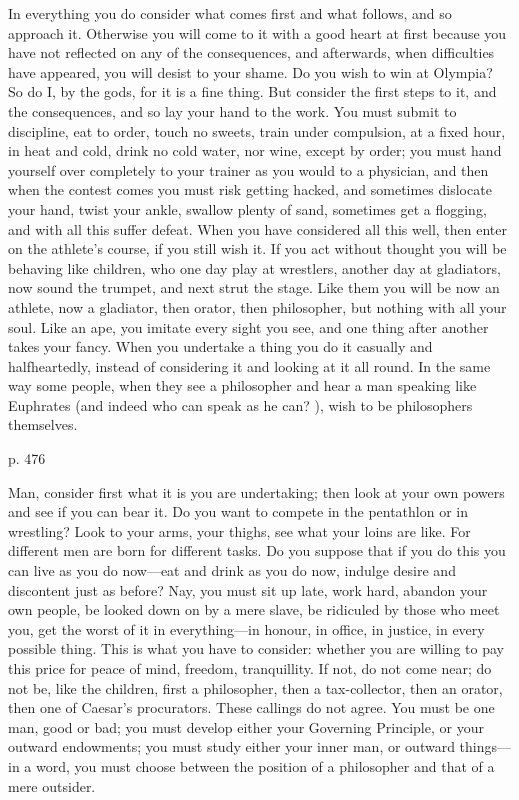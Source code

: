 In  everything you  do  consider what  comes  first and  what  follows, and  so
approach it. Otherwise you  will come to it with a good  heart at first because
you  have not  reflected  on  any of  the  consequences,  and afterwards,  when
difficulties have appeared, you  will desist to your shame. Do  you wish to win
at Olympia?  So do I,  by the gods,  for it is a  fine thing. But  consider the
first steps to it, and the consequences, and  so lay your hand to the work. You
must  submit  to  discipline,  eat  to order,  touch  no  sweets,  train  under
compulsion, at a fixed  hour, in heat and cold, drink no  cold water, nor wine,
except by order; you must hand yourself  over completely to your trainer as you
would to  a physician, and  then when the contest  comes you must  risk getting
hacked, and sometimes dislocate your hand,  twist your ankle, swallow plenty of
sand, sometimes get a flogging, and with  all this suffer defeat. When you have
considered all this well, then enter on the athlete's course, if you still wish
it. If you act without thought you  will be behaving like children, who one day
play at wrestlers,  another day at gladiators, now sound  the trumpet, and next
strut the stage.  Like them you will  be now an athlete, now  a gladiator, then
orator, then  philosopher, but  nothing with  all your soul.  Like an  ape, you
imitate every sight you see, and one thing after another takes your fancy. When
you  undertake  a thing  you  do  it  casually  and halfheartedly,  instead  of
considering it and looking  at it all round. In the same  way some people, when
they see a philosopher  and hear a man speaking like  Euphrates (and indeed who
can speak as he can? ), wish to be philosophers themselves.

p. 476

Man, consider  first what  it is  you are  undertaking; then  look at  your own
powers and see if you can bear it.  Do you want to compete in the pentathlon or
in wrestling? Look to your arms, your thighs, see what your loins are like. For
different men are born for different tasks.  Do you suppose that if you do this
you can live  as you do now—eat and  drink as you do now,  indulge desire and
discontent just as before?  Nay, you must sit up late,  work hard, abandon your
own people, be looked  down on by a mere slave, be ridiculed  by those who meet
you, get the worst  of it in everything—in honour, in  office, in justice, in
every  possible thing.  This is  what  you have  to consider:  whether you  are
willing to pay this price for peace  of mind, freedom, tranquillity. If not, do
not  come near;  do not  be, like  the children,  first a  philosopher, then  a
tax-collector, then an orator, then one of Caesar's procurators. These callings
do not agree.  You must be one man,  good or bad; you must  develop either your
Governing Principle,  or your  outward endowments; you  must study  either your
inner man, or outward things—in a  word, you must choose between the position
of a philosopher and that of a mere outsider.
